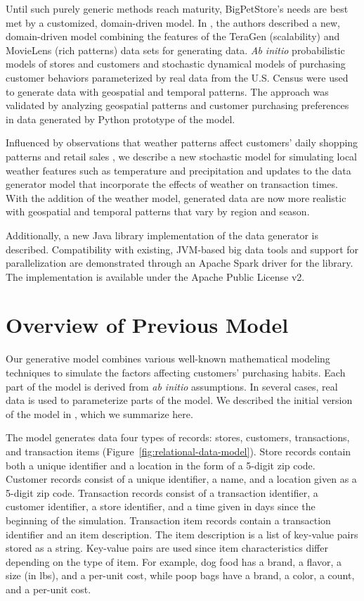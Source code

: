 \documentclass[conference]{IEEEtran}
\begin{document}
Until such purely generic methods reach maturity, BigPetStore's needs are best met by a customized, domain-driven model.  In \cite{Nowling2014}, the authors described a new, domain-driven model combining the features of the TeraGen (scalability) and MovieLens \cite{MovieLens} (rich patterns) data sets for generating data. \emph{Ab initio} probabilistic models of stores and customers and stochastic dynamical models of purchasing customer behaviors parameterized by real data from the U.S. Census were used to generate data with geospatial and temporal patterns.  The approach was validated by analyzing geospatial patterns and customer purchasing preferences in data generated by Python prototype of the model.

Influenced by observations that weather patterns affect customers' daily shopping patterns \cite{Parsons2001} and retail sales \cite{Starr-McCluer2000}, we describe a new stochastic model for simulating local weather features such as temperature and precipitation and updates to the data generator model that incorporate the effects of weather on transaction times. With the addition of the weather model, generated data are now more realistic with geospatial and temporal patterns that vary by region and season.  

Additionally, a new Java library implementation of the data generator is described.  Compatibility with existing, JVM-based big data tools and support for parallelization are demonstrated through an Apache Spark \cite{Zaharia2010, Zaharia2012} driver for the library.  The implementation is available under the Apache Public License v2.

\section{Overview of Previous Model}
Our generative model combines various well-known mathematical modeling techniques to simulate the factors affecting customers' purchasing habits.  Each part of the model is derived from \emph{ab initio} assumptions.  In several cases, real data is used to parameterize parts of the model. We described the initial version of the model in \cite{Nowling2014}, which we summarize here.

The model generates data four types of records: stores, customers, transactions, and transaction items (Figure~\ref{fig:relational-data-model}).  Store records contain both a unique identifier and a location in the form of a 5-digit zip code. Customer records consist of a unique identifier, a name, and a location given as a 5-digit zip code. Transaction records consist of a transaction identifier, a customer identifier, a store identifier, and a time given in days since the beginning of the simulation. Transaction item records contain a transaction identifier and an item description.  The item description is a list of key-value pairs stored as a string.  Key-value pairs are used since item characteristics differ depending on the type of item.  For example, dog food has a brand, a flavor, a size (in lbs), and a per-unit cost, while poop bags have a brand, a color, a count, and a per-unit cost.
\end{document}
